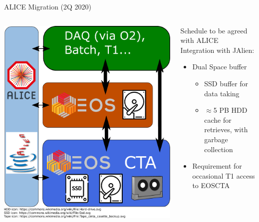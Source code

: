 \documentclass[aspectratio=1610]{beamer}
\begin{document}
\begin{frame}{ALICE Migration (2Q 2020)}
\begin{columns}
	\begin{column}{0.4\textwidth}
		\begin{center}
		  \includegraphics[width=\textwidth]{images/CTA_Deployment_ALICE.pdf}
		\end{center}
	\end{column}
	\begin{column}{0.55\textwidth}
      Schedule to be agreed with ALICE\\[1ex]

      Integration with JAlien:
		\begin{itemize}
         \item Dual Space buffer
		\begin{itemize}
		  \item SSD buffer for data taking
		  \item $\approx$5 PB HDD cache for retrieves, with garbage collection
		\end{itemize}
		  \item Requirement for occasional T1 access to EOSCTA
		\end{itemize}
	\end{column}
\end{columns}
\end{frame}
\end{document}
